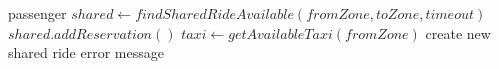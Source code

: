 \documentclass[preview]{standalone}
\begin{document}
\begin{algorithmic}
  {passenger}
  \State $ shared \gets findSharedRideAvailable(fromZone, toZone, timeout) $
    \State $ shared.addReservation() $
  \Else
    \State $ taxi \gets getAvailableTaxi(fromZone) $
      \State create new shared ride
    \Else
      \State error message
    \EndIf
  \EndIf
 \EndFunction
\end{algorithmic}
\end{document}
